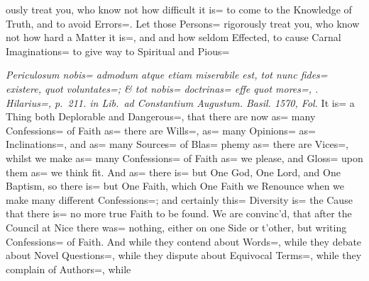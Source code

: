 \nointerlineskip
\noindent
ously treat you,
who know not how difficult it is= to come to the Knowledge of Truth,
and to avoid Errors=.
Let those Persons= rigorously treat you,
who know not how hard a Matter it is=,
and and how seldom Effected,
to cause Carnal Imaginations= to give way to Spiritual and Pious=\label{place:HE1}%
\marginpar{\raisebox{0pt}{\color{red}\pageref{place:HE2}}}

\cleardoublepage
\leavevmode\thispagestyle{empty}\newpage
{}
\textit{Periculosum nobis= admodum atque etiam miserabile est,
tot nunc fides= existere, quot voluntates=;
\& tot nobis= doctrinas= effe quot mores=, \etc.}
\textit{Hilarius=, p.\ 211. in Lib.\ ad Constantium Augustum.
Basil. 1570, Fol.}
It is= a Thing both Deplorable and Dangerous=,
that there are now as= many Confessions= of Faith as= there are Wills=,
as= many Opinions= as= Inclinations=,
and as= many Sources= of Blas= phemy as= there are Vices=,
whilst we make as= many Confessions= of Faith as= we please,
and Gloss= upon them as= we think fit.
And as= there is= but One God, One Lord, and One Baptism,
so there is= but One Faith,
which One Faith we Renounce when we make many different Confessions=;
and certainly this= Diversity is= the Cause that there is= no more true Faith to be found.
We are convinc'd, that after the Council at Nice there was= nothing,
either on one Side or t'other, but writing Confessions= of Faith.
And while they contend about Words=,
while they debate about Novel Questions=,
while they dispute about Equivocal Terms=,
while they complain of Authors=,
while\label{place:CO1}\marginpar{\raisebox{0pt}{\color{red}\pageref{place:CO2}}}

